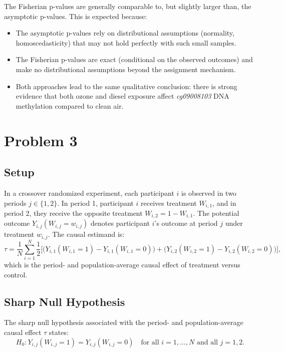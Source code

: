 \documentclass[11pt]{article}
\begin{document}
The Fisherian p-values are generally comparable to, but slightly larger than, the asymptotic p-values. This is expected because:
\begin{itemize}
  \item The asymptotic p-values rely on distributional assumptions (normality, homoscedasticity) that may not hold perfectly with such small samples.
  \item The Fisherian p-values are exact (conditional on the observed outcomes) and make no distributional assumptions beyond the assignment mechanism.
  \item Both approaches lead to the same qualitative conclusion: there is strong evidence that both ozone and diesel exposure affect \textit{cg09008103} DNA methylation compared to clean air.
\end{itemize}

\newpage
\section*{Problem 3}

\subsection*{Setup}

In a crossover randomized experiment, each participant $i$ is observed in two periods $j \in \{1, 2\}$. In period 1, participant $i$ receives treatment $W_{i,1}$, and in period 2, they receive the opposite treatment $W_{i,2} = 1 - W_{i,1}$. The potential outcome $Y_{i,j}(W_{i,j} = w_{i,j})$ denotes participant $i$'s outcome at period $j$ under treatment $w_{i,j}$. The causal estimand is:
\[
  \tau = \frac{1}{N} \sum_{i=1}^{N} \frac{1}{2} \Big[ \big(Y_{i,1}(W_{i,1}=1) - Y_{i,1}(W_{i,1}=0)\big) + \big(Y_{i,2}(W_{i,2}=1) - Y_{i,2}(W_{i,2}=0)\big) \Big],
\]
which is the period- and population-average causal effect of treatment versus control.

\subsection*{Sharp Null Hypothesis}

The sharp null hypothesis associated with the period- and population-average causal effect $\tau$ states:
\[
  H_0: Y_{i,j}(W_{i,j} = 1) = Y_{i,j}(W_{i,j} = 0) \quad \text{for all } i = 1, \ldots, N \text{ and all } j = 1, 2.
\]
\end{document}
